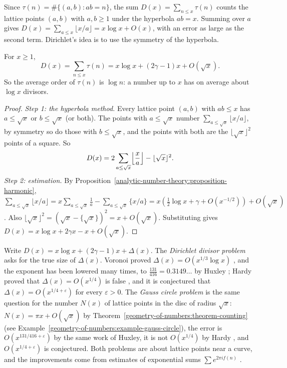 Since $\tau(n) = \#\{(a, b) : ab = n\}$, the sum $D(x) = \sum_{n \leq x}\tau(n)$ counts the lattice points $(a, b)$ with $a, b \geq 1$ under the hyperbola $ab = x$. Summing over $a$ gives
$D(x) = \sum_{a \leq x}\lfloor x/a\rfloor = x\log x + O(x)$, with an error as large as the second term. Dirichlet's idea is to use the symmetry of the hyperbola.

\begin{theorem}[Dirichlet]\label{analytic-number-theory:theorem-divisor-problem}
For $x \geq 1$,
\[
D(x) = \sum_{n \leq x}\tau(n) = x\log x + (2\gamma - 1)x + O(\sqrt{x}).
\]
So the average order of $\tau(n)$ is $\log n$: a number up to $x$ has on average about $\log x$ divisors.
\end{theorem}

\begin{proof}
\emph{Step 1: the hyperbola method.} Every lattice point $(a, b)$ with $ab \leq x$ has $a \leq \sqrt{x}$ or $b \leq \sqrt{x}$ (or both). The points with $a \leq \sqrt{x}$ number
$\sum_{a \leq \sqrt{x}}\lfloor x/a\rfloor$, by symmetry so do those with $b \leq \sqrt{x}$, and the points with both are the $\lfloor\sqrt{x}\rfloor^2$ points of a square. So
\[
D(x) = 2\sum_{a \leq \sqrt{x}}\Bigl\lfloor\frac xa\Bigr\rfloor - \lfloor\sqrt{x}\rfloor^2.
\]
\emph{Step 2: estimation.} By Proposition~\ref{analytic-number-theory:proposition-harmonic},
$\sum_{a \leq \sqrt{x}}\lfloor x/a\rfloor = x\sum_{a \leq \sqrt{x}}\frac1a - \sum_{a \leq \sqrt{x}}\{x/a\} = x(\frac12\log x + \gamma + O(x^{-1/2})) + O(\sqrt{x})$. Also
$\lfloor\sqrt{x}\rfloor^2 = (\sqrt{x} - \{\sqrt{x}\})^2 = x + O(\sqrt{x})$. Substituting gives $D(x) = x\log x + 2\gamma x - x + O(\sqrt{x})$.
\end{proof}

\begin{remark}\label{analytic-number-theory:remark-divisor-exponents}
Write $D(x) = x\log x + (2\gamma - 1)x + \Delta(x)$. The \emph{Dirichlet divisor problem} asks for the true size of $\Delta(x)$. Voronoi proved $\Delta(x) = O(x^{1/3}\log x)$ \cite{voronoi-1903}, and the
exponent has been lowered many times, to $\frac{131}{416} = 0.3149\ldots$ by Huxley \cite{huxley-2003}; Hardy proved that $\Delta(x) = O(x^{1/4})$ is false \cite{hardy-1916-divisor}, and it is conjectured that
$\Delta(x) = O(x^{1/4 + \varepsilon})$ for every $\varepsilon > 0$. The \emph{Gauss circle problem} is the same question for the number $N(x)$ of lattice points in the disc of radius $\sqrt{x}$:
$N(x) = \pi x + O(\sqrt{x})$ by Theorem~\ref{geometry-of-numbers:theorem-counting} (see Example~\ref{geometry-of-numbers:example-gauss-circle}), the error is $O(x^{131/416 + \varepsilon})$ by the same
work of Huxley, it is not $O(x^{1/4})$ by Hardy \cite{hardy-1915-circle}, and $O(x^{1/4 + \varepsilon})$ is conjectured. Both problems are about lattice points near a curve, and the improvements come
from estimates of exponential sums $\sum e^{2\pi if(n)}$ \cite{iwaniec-kowalski}.
\end{remark}

